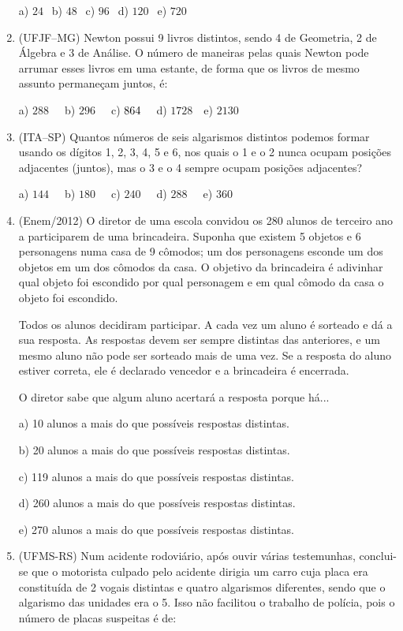 \begin{multicols*}{2}
\begin{enumerate}
		a) $24 \ \ $ b) $48 \ \ $ c) $96 \ \ $ d) $120 \ \ $ e) $720 \ \ $

		\item (UFJF–MG) Newton possui 9 livros distintos, sendo 4 de Geometria, 2 de Álgebra e 3 de Análise. O número de maneiras pelas quais Newton pode arrumar esses livros em uma estante, de forma que os livros de mesmo assunto permaneçam juntos, é:
		
		a) $288 \ \ \ \ \ $ b) $296 \ \ \ \ \ $ c) $864 \ \ \ \ \\ $ d) $1728 \ \ \ $ e) $2130 \ \ $

		\item (ITA–SP) Quantos números de seis algarismos distintos podemos formar usando os dígitos 1, 2, 3, 4, 5 e 6, nos quais o 1 e o 2 nunca ocupam posições adjacentes (juntos), mas o 3 e o 4 sempre ocupam posições adjacentes? 

		a) $144 \ \ \ \ \ $ b) $180 \ \ \ \ \ $ c) $240 \ \ \ \ \ $ d) $288 \ \ \ \ \ $ e) $360 \ \ $

		\item (Enem/2012) O diretor de uma escola convidou os 280 alunos de terceiro ano a participarem de uma brincadeira. Suponha que existem 5 objetos e 6 personagens numa casa de 9 cômodos; um dos personagens esconde um dos objetos em um dos cômodos da casa. O objetivo da brincadeira é adivinhar qual objeto foi escondido por qual personagem e em qual cômodo da casa o objeto foi escondido.
		
		Todos os alunos decidiram participar. A cada vez um aluno é sorteado e dá a sua resposta. As respostas devem ser sempre distintas das anteriores, e um mesmo aluno não pode ser sorteado mais de uma vez. Se a resposta do aluno estiver correta, ele é declarado vencedor e a brincadeira é encerrada.
		
O diretor sabe que algum aluno acertará a resposta porque há...

a) 10 alunos a mais do que possíveis respostas distintas.

b) 20 alunos a mais do que possíveis respostas distintas.

c) 119 alunos a mais do que possíveis respostas distintas.

d) 260 alunos a mais do que possíveis respostas distintas.

e) 270 alunos a mais do que possíveis respostas distintas.

		\item (UFMS-RS) Num acidente rodoviário, após ouvir várias testemunhas, conclui-se que o motorista culpado pelo acidente dirigia um carro cuja placa era constituída de 2 vogais distintas e quatro algarismos diferentes, sendo que o algarismo das unidades era o 5. Isso não facilitou o trabalho de polícia, pois o número de placas suspeitas é de: 
		

\end{enumerate}
\end{multicols*}
